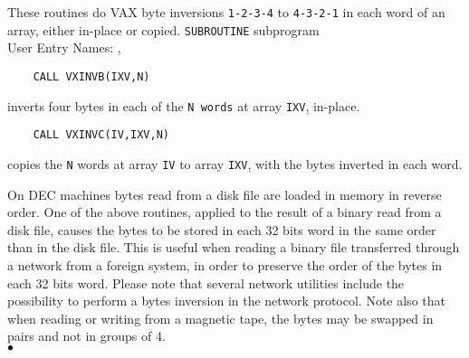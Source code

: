                           
 
\Submitter{}                                  
These routines do VAX byte inversions {\tt 1-2-3-4} to {\tt 4-3-2-1}
in each word of an array, either in-place or copied.
\Structure
{\tt SUBROUTINE} subprogram \\
User Entry Names: , 
\Usage
\begin{verbatim}
    CALL VXINVB(IXV,N)
\end{verbatim}
inverts four bytes in each of the {\tt N words}
at array {\tt IXV}, in-place.
\begin{verbatim}
    CALL VXINVC(IV,IXV,N)
\end{verbatim}
copies the {\tt N} words at array {\tt IV} to array {\tt IXV}, with
the bytes inverted in each word.
\par
On DEC machines  bytes read from a disk file are
loaded in memory in reverse order. One of the above routines,
applied to the result of a binary read from a disk file, causes
the bytes to be stored in each 32 bits word in the same order than
in the disk file. This is useful when reading a binary file
transferred through a network from a foreign system, in order to
preserve the order of the bytes in each 32 bits word.
Please note that several network utilities include the possibility
to perform a bytes inversion in the network protocol. Note also
that when reading or writing from a magnetic tape, the bytes may be
swapped in pairs and not in groups of 4.
\\ $\bullet$
